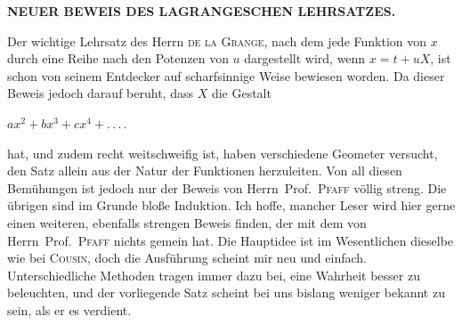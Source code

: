 \clearpage
{}
\begin{center}
\textbf{NEUER BEWEIS DES LAGRANGESCHEN LEHRSATZES.}
\end{center}

\noindent\hspace*{\parindent}Der wichtige Lehrsatz des Herrn \textsc{de la Grange}, nach dem jede Funktion von
$x$ durch eine Reihe nach den Potenzen von $u$ dargestellt wird, wenn $x=t+uX$,
ist schon von seinem Entdecker auf scharfsinnige Weise bewiesen worden.
Da dieser Beweis jedoch darauf beruht, dass $X$ die Gestalt
\begin{center}
$\displaystyle ax^2+bx^3+cx^4+.\,.\,.\,.$
\end{center}
\noindent hat, und zudem recht weitschweifig ist, haben verschiedene Geometer versucht,
den Satz allein aus der Natur der Funktionen herzuleiten.
Von all diesen Bemühungen ist jedoch nur der Beweis von Herrn\ Prof.\ \textsc{Pfaff}
völlig streng. Die übrigen sind im Grunde bloße Induktion. Ich hoffe,
mancher Leser wird hier gerne einen weiteren, ebenfalls strengen Beweis
finden, der mit dem von Herrn\ Prof.\ \textsc{Pfaff} nichts gemein hat. Die
Hauptidee ist im Wesentlichen dieselbe wie bei \textsc{Cousin}, doch die
Ausführung scheint mir neu und einfach. Unterschiedliche Methoden tragen
immer dazu bei, eine Wahrheit besser zu beleuchten, und der vorliegende
Satz scheint bei uns bislang weniger bekannt zu sein, als er es verdient.


